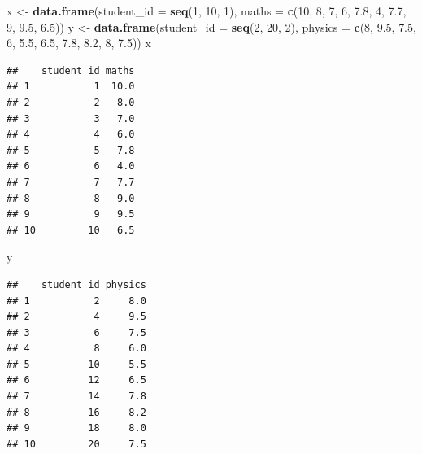 \documentclass[]{krantz}
\makeatletter
\newenvironment{Shaded}{\begin{snugshade}}{\end{snugshade}}
\newcommand{\CommentTok}[1]{\textcolor[rgb]{0.37,0.37,0.37}{\textit{#1}}}
\newcommand{\DataTypeTok}[1]{\textcolor[rgb]{0.27,0.27,0.27}{#1}}
\newcommand{\DecValTok}[1]{\textcolor[rgb]{0.06,0.06,0.06}{#1}}
\newcommand{\FloatTok}[1]{\textcolor[rgb]{0.06,0.06,0.06}{#1}}
\newcommand{\KeywordTok}[1]{\textcolor[rgb]{0.27,0.27,0.27}{\textbf{#1}}}
\newcommand{\NormalTok}[1]{#1}
\newcommand{\OperatorTok}[1]{\textcolor[rgb]{0.43,0.43,0.43}{\textbf{#1}}}
\newcommand{\StringTok}[1]{\textcolor[rgb]{0.5,0.5,0.5}{#1}}
\newenvironment{kframe}{%
\medskip{}
\setlength{\fboxsep}{.8em}
 \def\at@end@of@kframe{}%
 \ifinner\ifhmode%
  \def\at@end@of@kframe{\end{minipage}}%
  \begin{minipage}{\columnwidth}%
 \fi\fi%
 \def\FrameCommand##1{\hskip\@totalleftmargin \hskip-\fboxsep
 \colorbox{shadecolor}{##1}\hskip-\fboxsep
     \hskip-\linewidth \hskip-\@totalleftmargin \hskip\columnwidth}%
 \MakeFramed {\advance\hsize-\width
   \@totalleftmargin\z@ \linewidth\hsize
   \@setminipage}}%
 {\par\unskip\endMakeFramed%
 \at@end@of@kframe}
\renewenvironment{Shaded}{\begin{kframe}}{\end{kframe}}
\renewenvironment{Shaded}{\begin{snugshade}}{\end{snugshade}}
\renewcommand{\CommentTok}[1]{\textcolor[rgb]{0.56,0.35,0.01}{\textit{#1}}}
\renewcommand{\DataTypeTok}[1]{\textcolor[rgb]{0.13,0.29,0.53}{#1}}
\renewcommand{\DecValTok}[1]{\textcolor[rgb]{0.00,0.00,0.81}{#1}}
\renewcommand{\FloatTok}[1]{\textcolor[rgb]{0.00,0.00,0.81}{#1}}
\renewcommand{\KeywordTok}[1]{\textcolor[rgb]{0.13,0.29,0.53}{\textbf{#1}}}
\renewcommand{\NormalTok}[1]{#1}
\renewcommand{\OperatorTok}[1]{\textcolor[rgb]{0.81,0.36,0.00}{\textbf{#1}}}
\renewcommand{\StringTok}[1]{\textcolor[rgb]{0.31,0.60,0.02}{#1}}
\theoremstyle{definition}
\theoremstyle{definition}
\theoremstyle{definition}
\theoremstyle{remark}
\makeatother
\begin{document}
\begin{Shaded}
\begin{Highlighting}[]
\NormalTok{x <-}\StringTok{ }\KeywordTok{data.frame}\NormalTok{(}\DataTypeTok{student_id =} \KeywordTok{seq}\NormalTok{(}\DecValTok{1}\NormalTok{, }\DecValTok{10}\NormalTok{, }\DecValTok{1}\NormalTok{), }
                \DataTypeTok{maths =} \KeywordTok{c}\NormalTok{(}\DecValTok{10}\NormalTok{, }\DecValTok{8}\NormalTok{, }\DecValTok{7}\NormalTok{, }\DecValTok{6}\NormalTok{, }\FloatTok{7.8}\NormalTok{, }\DecValTok{4}\NormalTok{, }
                          \FloatTok{7.7}\NormalTok{, }\DecValTok{9}\NormalTok{, }\FloatTok{9.5}\NormalTok{, }\FloatTok{6.5}\NormalTok{))}
\NormalTok{y <-}\StringTok{ }\KeywordTok{data.frame}\NormalTok{(}\DataTypeTok{student_id =} \KeywordTok{seq}\NormalTok{(}\DecValTok{2}\NormalTok{, }\DecValTok{20}\NormalTok{, }\DecValTok{2}\NormalTok{), }
                \DataTypeTok{physics =} \KeywordTok{c}\NormalTok{(}\DecValTok{8}\NormalTok{, }\FloatTok{9.5}\NormalTok{, }\FloatTok{7.5}\NormalTok{, }\DecValTok{6}\NormalTok{, }\FloatTok{5.5}\NormalTok{, }
                            \FloatTok{6.5}\NormalTok{, }\FloatTok{7.8}\NormalTok{, }\FloatTok{8.2}\NormalTok{, }\DecValTok{8}\NormalTok{, }\FloatTok{7.5}\NormalTok{))}
\NormalTok{x}
\end{Highlighting}
\end{Shaded}

\begin{verbatim}
##    student_id maths
## 1           1  10.0
## 2           2   8.0
## 3           3   7.0
## 4           4   6.0
## 5           5   7.8
## 6           6   4.0
## 7           7   7.7
## 8           8   9.0
## 9           9   9.5
## 10         10   6.5
\end{verbatim}

\begin{Shaded}
\begin{Highlighting}[]
\NormalTok{y}
\end{Highlighting}
\end{Shaded}

\begin{verbatim}
##    student_id physics
## 1           2     8.0
## 2           4     9.5
## 3           6     7.5
## 4           8     6.0
## 5          10     5.5
## 6          12     6.5
## 7          14     7.8
## 8          16     8.2
## 9          18     8.0
## 10         20     7.5
\end{verbatim}

\begin{Shaded}
\end{Shaded}
\end{document}
